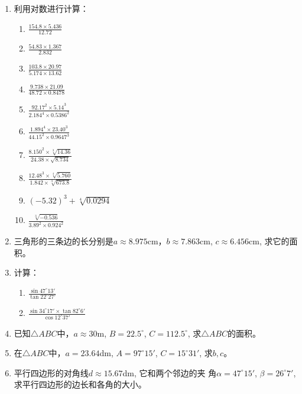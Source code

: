 \begin{enumerate}
    \item 利用对数进行计算：
\begin{multicols}{2}
\begin{enumerate}
    \item $\frac{154.8 \times 5.436}{12.72}$
    \item $\frac{54.83 \times 1.367}{2.832}$
    \item $\frac{103.8 \times 20.97}{5.174 \times 13.62}$
    \item $\frac{9.738 \times 21.09}{48.72 \times 0.8478}$
    \item $\frac{92.17^{2} \times 5.14^{3}}{2.184^{4} \times 0.5386^{2}}$
    \item $\frac{1.894^{4} \times 23.40^{3}}{44.15^{2} \times 0.9647^{3}}$
    \item  $\frac{8.150^{2} \times \sqrt[3]{14.36}}{24.38 \times \sqrt{8.734}}$
    \item $ \frac{12.48^{3} \times \sqrt[4]{5.760}}{1.842 \times \sqrt[3]{673.8}}$
    \item $(-5.32)^{3}+\sqrt[4]{0.0294}$
    \item $\frac{\sqrt[3]{-0.536}}{3.89^{2} \times 0.924^{2}}$
\end{enumerate}
\end{multicols}
\item 三角形的三条边的长分别是$a\approx 8.975$cm，$b \approx 7.863$cm, $c\approx 6.456$cm, 求它的面积。

\item  计算：
\begin{multicols}{2}
\begin{enumerate}
    \item $\frac{\sin 47^{\circ} 13'}{\tan22^{\circ} 27'}$
    \item $\frac{\sin 34^{\circ} 17' \times \tan82^{\circ} 6'}{\cos 12^{\circ} 37'}$
\end{enumerate}
\end{multicols}
\item 已知$\triangle ABC$中，$a\approx30$m, $B=22.5^{\circ}$, $C=112.5^{\circ}$, 求$\triangle ABC$的面积。

\item 在$\triangle ABC$中，$a=23.64$dm, $A=97^{\circ}15'$, $C=15^{\circ}31'$,
求$b,c$。
\item 
平行四边形的对角线$d\approx 15.67$dm, 它和两个邻边的夹
角$\alpha=47^{\circ}15'$, $\beta=26^{\circ}7'$, 求平行四边形的边长和各角的大小。


\end{enumerate}
